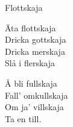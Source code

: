 \begin{song}{Flottskaja}
	
	
	
	
	Äta flottskaja\\
	Dricka gottskaja\\
	Dricka merskaja\\
	Slå i flerskaja

	Å bli fullskaja\\
	Fall’ omkullskaja\\
	Om ja’ villskaja\\
	Ta en till.

\end{song}
